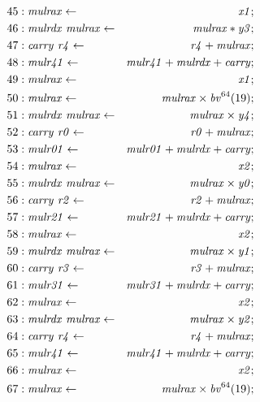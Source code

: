 {\begin{align*}
45 &: \mathit{mulrax} \leftarrow & \mathit{x1}; \\
46 &: \mathit{mulrdx}\ \mathit{mulrax} \leftarrow & \mathit{mulrax} * \mathit{y3}; \\
47 &: \mathit{carry}\ \mathit{r4} \leftarrow & \mathit{r4} + \mathit{mulrax}; \\
48 &: \mathit{mulr41} \leftarrow & \mathit{mulr41} + \mathit{mulrdx} + \mathit{carry}; \\
49 &: \mathit{mulrax} \leftarrow & \mathit{x1}; \\
50 &: \mathit{mulrax} \leftarrow & \mathit{mulrax} \times \bv^{64}(19); \\
51 &: \mathit{mulrdx}\ \mathit{mulrax} \leftarrow & \mathit{mulrax} \times \mathit{y4}; \\
52 &: \mathit{carry}\ \mathit{r0} \leftarrow & \mathit{r0} + \mathit{mulrax}; \\
53 &: \mathit{mulr01} \leftarrow & \mathit{mulr01} + \mathit{mulrdx} + \mathit{carry}; \\
54 &: \mathit{mulrax} \leftarrow & \mathit{x2}; \\
55 &: \mathit{mulrdx}\ \mathit{mulrax} \leftarrow & \mathit{mulrax} \times \mathit{y0}; \\
56 &: \mathit{carry}\ \mathit{r2} \leftarrow & \mathit{r2} + \mathit{mulrax}; \\
57 &: \mathit{mulr21} \leftarrow & \mathit{mulr21} + \mathit{mulrdx} + \mathit{carry}; \\
58 &: \mathit{mulrax} \leftarrow & \mathit{x2}; \\
59 &: \mathit{mulrdx}\ \mathit{mulrax} \leftarrow & \mathit{mulrax} \times \mathit{y1}; \\
60 &: \mathit{carry}\ \mathit{r3} \leftarrow & \mathit{r3} + \mathit{mulrax}; \\
61 &: \mathit{mulr31} \leftarrow & \mathit{mulr31} + \mathit{mulrdx} + \mathit{carry}; \\
62 &: \mathit{mulrax} \leftarrow & \mathit{x2}; \\
63 &: \mathit{mulrdx}\ \mathit{mulrax} \leftarrow & \mathit{mulrax} \times \mathit{y2}; \\
64 &: \mathit{carry}\ \mathit{r4} \leftarrow & \mathit{r4} + \mathit{mulrax}; \\
65 &: \mathit{mulr41} \leftarrow & \mathit{mulr41} + \mathit{mulrdx} + \mathit{carry}; \\
66 &: \mathit{mulrax} \leftarrow & \mathit{x2}; \\
67 &: \mathit{mulrax} \leftarrow & \mathit{mulrax} \times \bv^{64}(19); \\

\end{align*}}
